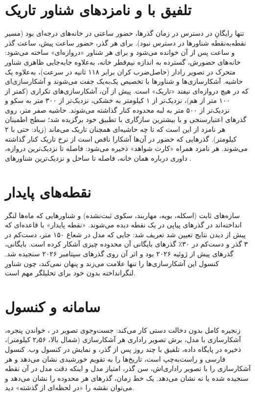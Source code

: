 \section{تلفیق با  و نامزدهای شناور تاریک}
\label{sec:fusion}
تنها  رایگانِ در دسترس در زمان گذرها، حضور ساعتی  در خانه‌های 
درجه‌ای بود (مسیر نقطه‌به‌نقطه شناورها در دسترس نبود). برای هر گذر، حضور ساعت پیش، ساعت گذر
و ساعت پس از آن خوانده می‌شود و برای هر شناور «دروازه‌ای» ساخته می‌شود: خانه‌های حضورش،
گسترده به اندازه نیم‌قطر خانه، به‌علاوه جابه‌جایی ظاهری شناور متحرک در تصویر رادار
(حاصل‌ضرب کران  برابر ۱۱۸ ثانیه در سرعت)، به‌علاوه یک حاشیه. آشکارسازی‌ها و شناورها
با تخصیص یک‌به‌یک \cite{kuhn1955} جفت می‌شوند و آشکارسازی‌ای که در هیچ دروازه‌ای نیفتد
«تاریک» است. پیش از آن، آشکارسازی‌های تکراری (کمتر از ۱۰۰ متر از هم)، نزدیک‌تر از ۱ کیلومتر
به خشکی، نزدیک‌تر از ۳۰۰ متر به سکو و نزدیک‌تر از ۵۰۰ متر به لبه محدوده کنار گذاشته
می‌شوند. حاشیه صفر متر، روی گذرهای اعتبارسنجی و با بیشترین سازگاری با تطبیق خود 
برگزیده شد؛ سطح اطمینان هر نامزد از این است که تا چه حاشیه‌ای همچنان تاریک می‌ماند (زیاد:
حتی با ۲ کیلومتر). گذرهایی که حضور  در آن‌ها آشکارا ناقص است از نرخ تاریک کنار
گذاشته می‌شوند. هر نامزد همراه «کارت شواهد» ذخیره می‌شود: فاصله تا نزدیک‌ترین دروازه،
داوری  درباره همان خانه، فاصله تا ساحل و نزدیک‌ترین شناورهای .

\section{نقطه‌های پایدار}
\label{sec:persistence}
سازه‌های ثابت (اسکله، بویه، مهاربند، سکوی ثبت‌نشده) و شناورهایی که ماه‌ها لنگر انداخته‌اند
در گذرهای پیاپی در یک نقطه دیده می‌شوند. «نقطه پایدار» با قاعده‌ای که پیش از دیدن نتایج
تعیین شد تعریف شد: جایی که مدل در شعاع ۱۵۰ متر، دست‌کم در ۳ گذر و دست‌کم در ۳۰٪ گذرهای
بایگانی آن محدوده چیزی آشکار کرده است. بایگانی، گذرهای  پیش از ژوئیه ۲۰۲۶ بود
و اثر آن روی گذرهای سپتامبر ۲۰۲۶ سنجیده شد. کنسول این آشکارسازی‌ها را تنها علامت می‌زند و
پنهان نمی‌کند، چون شناورِ لنگرانداخته بدون  خود برای تحلیلگر مهم است.

\section{سامانه و کنسول}
زنجیره کامل بدون دخالت دستی کار می‌کند: جست‌وجوی تصویر در ، خواندن پنجره،
آشکارسازی با مدل، برش تصویر راداری هر آشکارسازی (شمال بالا، ۲٫۵۶ کیلومتر)، ذخیره در پایگاه
داده، تلفیق با  چند روز پس از گذر، و نمایش در کنسول وب. کنسول فارسی و راست‌به‌چپ
است، تاریخ‌ها را به تقویم خورشیدی نشان می‌دهد و هر آشکارسازی را با تصویر راداری‌اش، سن گذر،
امتیاز مدل و اینکه دقت مدل در آن نقطه سنجیده شده یا نه نشان می‌دهد. یک خط زمان، گذرهای
هر محدوده را نشان می‌دهد و می‌توان نقشه را «در لحظه‌ای از گذشته» دید.
